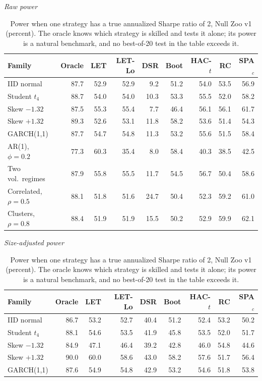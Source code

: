 \begin{table}[t]
\centering
\small
\caption{Power when one strategy has a true annualized Sharpe ratio of 2, Null Zoo v1 (percent). The oracle knows which strategy is skilled and tests it alone; its power is a natural benchmark, and no best-of-20 test in the table exceeds it.}
\label{tab:power}
\par\textit{Raw power}\par\smallskip
\begin{tabular}{lrrrrrrrr}
\toprule
Family & Oracle & LET & LET-Lo & DSR & Boot & HAC-$t$ & RC & SPA$_c$ \\
\midrule
IID normal & 87.7 & 52.9 & 52.9 & 9.2 & 51.2 & 54.0 & 53.5 & 56.9 \\
Student $t_4$ & 88.7 & 54.0 & 54.0 & 10.3 & 53.3 & 55.5 & 52.0 & 58.2 \\
Skew $-1.32$ & 87.5 & 55.3 & 55.4 & 7.7 & 46.4 & 56.1 & 56.1 & 61.7 \\
Skew $+1.32$ & 89.3 & 52.6 & 53.1 & 11.8 & 58.2 & 53.6 & 51.4 & 54.3 \\
GARCH(1,1) & 87.7 & 54.7 & 54.8 & 11.3 & 53.2 & 55.6 & 51.5 & 58.4 \\
AR(1), $\phi=0.2$ & 77.3 & 60.3 & 35.4 & 8.0 & 58.4 & 40.3 & 38.5 & 42.5 \\
Two vol.\ regimes & 87.9 & 55.8 & 55.5 & 11.7 & 54.5 & 56.7 & 50.4 & 58.6 \\
Correlated, $\rho=0.5$ & 88.1 & 51.8 & 51.6 & 24.7 & 50.4 & 52.3 & 59.2 & 61.0 \\
Clusters, $\rho=0.8$ & 88.4 & 51.9 & 51.9 & 15.5 & 50.2 & 52.9 & 59.9 & 62.1 \\
\bottomrule
\end{tabular}
\par
\medskip
\par\textit{Size-adjusted power}\par\smallskip
\begin{tabular}{lrrrrrrrr}
\toprule
Family & Oracle & LET & LET-Lo & DSR & Boot & HAC-$t$ & RC & SPA$_c$ \\
\midrule
IID normal & 86.7 & 53.2 & 52.7 & 40.4 & 51.2 & 52.4 & 53.2 & 50.2 \\
Student $t_4$ & 88.1 & 54.6 & 53.5 & 41.9 & 45.8 & 53.5 & 52.0 & 51.7 \\
Skew $-1.32$ & 84.9 & 47.1 & 46.4 & 39.2 & 42.8 & 46.0 & 54.8 & 44.6 \\
Skew $+1.32$ & 90.0 & 60.0 & 58.6 & 43.0 & 58.2 & 57.6 & 51.7 & 56.4 \\
GARCH(1,1) & 87.6 & 54.9 & 54.8 & 42.9 & 53.2 & 54.6 & 51.8 & 53.8 \\

\end{tabular}
\end{table}
